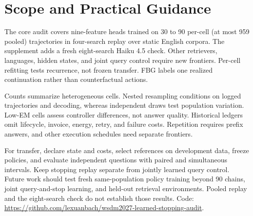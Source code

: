 \section{Scope and Practical Guidance}
\label{sec:limitations}

The core audit covers nine-feature heads trained on 30 to 90 per-cell
(at most 959 pooled) trajectories in four-search replay over static English
corpora. The supplement adds a fresh eight-search Haiku 4.5 check. Other
retrievers, languages, hidden states, and joint query control require new
frontiers. Per-cell refitting tests recurrence, not frozen transfer. FBG
labels one realized continuation rather than counterfactual actions.

Counts summarize heterogeneous cells. Nested resampling conditions on logged
trajectories and decoding, whereas independent draws test population variation.
Low-EM cells assess controller differences, not answer quality. Historical
ledgers omit lifecycle, invoice, energy, retry, and failure costs. Repetition
requires prefix answers, and other execution schedules need separate frontiers.

For transfer, declare state and costs, select references on development data,
freeze policies, and evaluate independent questions with paired and simultaneous
intervals. Keep stopping replay separate from jointly learned query control.
Future work should test fresh same-population policy training beyond 90
chains, joint query-and-stop learning, and held-out retrieval environments.
Pooled replay and the eight-search check do not establish those results.
Code: \url{https://github.com/lexuanbach/wsdm2027-learned-stopping-audit}.
